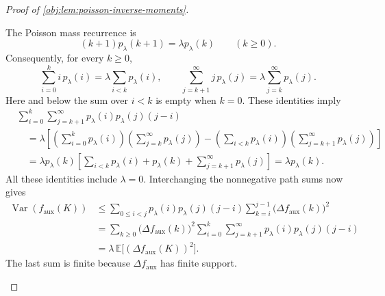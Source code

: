 \begin{proof}[Proof of \cref{obj:lem:poisson-inverse-moments}]
\begin{enumerate}
The Poisson mass recurrence is
\[
(k+1)p_\lambda(k+1)=\lambda p_\lambda(k)
\qquad(k\ge0).
\]
Consequently, for every \(k\ge0\),
\[
\sum_{i=0}^{k}i\,p_\lambda(i)
=\lambda\sum_{i<k}p_\lambda(i),
\qquad
\sum_{j=k+1}^{\infty}j\,p_\lambda(j)
=\lambda\sum_{j=k}^{\infty}p_\lambda(j).
\]
Here and below the sum over \(i<k\) is empty when \(k=0\). These identities imply
\[
\begin{aligned}
&\sum_{i=0}^{k}\sum_{j=k+1}^{\infty}
p_\lambda(i)p_\lambda(j)(j-i)\\
&\quad=\lambda\left[
\left(\sum_{i=0}^{k}p_\lambda(i)\right)
\left(\sum_{j=k}^{\infty}p_\lambda(j)\right)
-
\left(\sum_{i<k}p_\lambda(i)\right)
\left(\sum_{j=k+1}^{\infty}p_\lambda(j)\right)
\right]\\
&\quad=\lambda p_\lambda(k)
\left[
\sum_{i<k}p_\lambda(i)+p_\lambda(k)
+\sum_{j=k+1}^{\infty}p_\lambda(j)
\right]
=\lambda p_\lambda(k).
\end{aligned}
\]
All these identities include \(\lambda=0\). Interchanging the nonnegative path sums now gives
\[
\begin{aligned}
\operatorname{Var}(f_{\mathrm{aux}}(K))
&\le
\sum_{0\le i<j}p_\lambda(i)p_\lambda(j)(j-i)
\sum_{k=i}^{j-1}\bigl(\Delta f_{\mathrm{aux}}(k)\bigr)^2\\
&=
\sum_{k\ge0}\bigl(\Delta f_{\mathrm{aux}}(k)\bigr)^2
\sum_{i=0}^{k}\sum_{j=k+1}^{\infty}
p_\lambda(i)p_\lambda(j)(j-i)\\
&=\lambda\,\mathbb E\bigl[(\Delta f_{\mathrm{aux}}(K))^2\bigr].
\end{aligned}
\]
The last sum is finite because \(\Delta f_{\mathrm{aux}}\) has finite support. %


\end{enumerate}
\end{proof}
